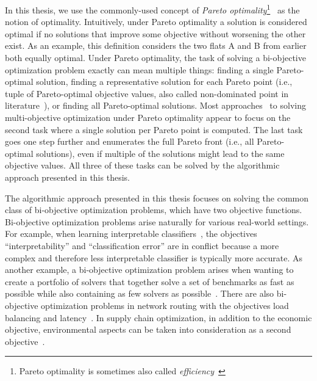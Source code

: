 In this thesis, we use the commonly-used concept of \emph{Pareto optimality}\footnote{Pareto optimality is sometimes also called \emph{efficiency}~\autocite{DBLP:journals/siamjo/SantisENR20}}~\autocite{Ehrgott2005-2} as the notion of optimality.
Intuitively, under Pareto optimality a solution is considered optimal if no solutions that improve some objective without worsening the other exist.
As an example, this definition considers the two flats A and B from earlier both equally optimal.
Under Pareto optimality, the task of solving a bi-objective optimization problem exactly can mean multiple things:
finding a single Pareto-optimal solution, finding a representative solution for each Pareto point (i.e., tuple of Pareto-optimal objective values, also called non-dominated point in literature~\autocite{Ehrgott2005-2}), or finding all Pareto-optimal solutions.
Most approaches~\autocite{DBLP:conf/cp/SohBTB17,DBLP:conf/cp/JanotaMSM21,DBLP:conf/ijcai/Terra-NevesLM18a} to solving multi-objective optimization under Pareto optimality appear to focus on the second task where a single solution per Pareto point is computed.
The last task goes one step further and enumerates the full Pareto front (i.e., all Pareto-optimal solutions), even if multiple of the solutions might lead to the same objective values.
All three of these tasks can be solved by the algorithmic approach presented in this thesis.

The algorithmic approach presented in this thesis focuses on solving the common class of bi-objective optimization problems, which have two objective functions.
Bi-objective optimization problems arise naturally for various real-world settings.
For example, when learning interpretable classifiers~\autocites{DBLP:conf/ijcai/Ignatiev0NS21,DBLP:conf/cp/MaliotovM18,DBLP:conf/ijcai/NarodytskaIPM18,DBLP:conf/ijcai/Hu0HH20,DBLP:journals/corr/abs-2010-09919,DBLP:conf/cp/YuISB20,DBLP:conf/aaai/Ignatiev0S021,DBLP:conf/cade/IgnatievPNM18}, the objectives ``interpretability'' and ``classification error'' are in conflict because a more complex and therefore less interpretable classifier is typically more accurate.
As another example, a bi-objective optimization problem arises when wanting to create a portfolio of solvers that together solve a set of benchmarks as fast as possible while also containing as few solvers as possible~\autocite{DBLP:conf/cp/JanotaMSM21}.
There are also bi-objective optimization problems in network routing with the objectives load balancing and latency~\autocite{SilverioEtAl2022biobjectiveoptimization}.
In supply chain optimization, in addition to the economic objective, environmental aspects can be taken into consideration as a second objective~\autocites{DBLP:journals/cce/Pinto-VarelaBN11,DBLP:journals/candie/TautenhainBN19}.

